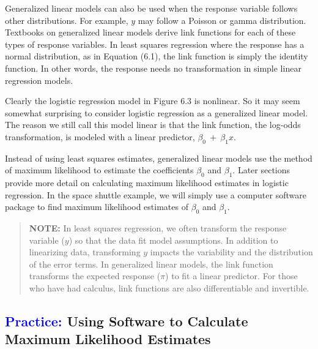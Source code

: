 \documentclass[
]{report}
\begin{document}
Generalized linear models can also be used when the response variable follows other distributions. For example, \(\scriptstyle y\) may follow a Poisson or gamma distribution. Textbooks on generalized linear models derive link functions for each of these types of response variables. In least squares regression where the response has a normal distribution, as in Equation (6.1), the link function is simply the identity function. In other words, the response needs no transformation in simple linear regression models.

Clearly the logistic regression model in Figure 6.3 is nonlinear. So it may seem somewhat surprising to consider logistic regression as a generalized linear model. The reason we still call this model linear is that the link function, the log-odds transformation, is modeled with a linear predictor, \(\scriptstyle \beta_0 \ +\  \beta_1 x\).

Instead of using least squares estimates, generalized linear models use the method of maximum likelihood to estimate the coefficients \(\scriptstyle \beta_0\) and \(\scriptstyle \beta_1\). Later sections provide more detail on calculating maximum likelihood estimates in logistic regression. In the space shuttle example, we will simply use a computer software package to find maximum likelihood estimates of \(\scriptstyle \beta_0\) and \(\scriptstyle \beta_1\).

\begin{quote}
\textbf{NOTE:} In least squares regression, we often transform the response variable (\(\scriptstyle y\)) so that the data fit model assumptions. In addition to linearizing data, transforming \(\scriptstyle y\) impacts the variability and the distribution of the error terms. In generalized linear models, the link function transforms the expected response (\(\scriptstyle \pi\)) to fit a linear predictor. For those who have had calculus, link functions are also differentiable and invertible.
\end{quote}

\hypertarget{using-software-to-calculate-maximum-likelihood-estimates}{%
\subsection*{\texorpdfstring{\textcolor{blue}{Practice:} Using Software to Calculate Maximum Likelihood Estimates}{ Using Software to Calculate Maximum Likelihood Estimates}}\label{using-software-to-calculate-maximum-likelihood-estimates}}
\end{document}
